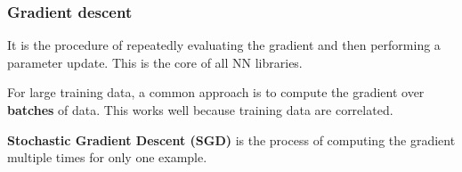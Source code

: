 \documentclass{beamer}
\begin{document}
\begin{frame}
  \frametitle{Gradient descent}
  It is the procedure of repeatedly evaluating the gradient and then performing a parameter update. This is the core of all NN libraries.

  For large training data, a common approach is to compute the gradient over \textbf{batches} of data. This works well because training data are correlated.

  \textbf{Stochastic Gradient Descent (SGD)} is the process of computing the gradient multiple times for only one example.
\end{frame}


\end{document}
